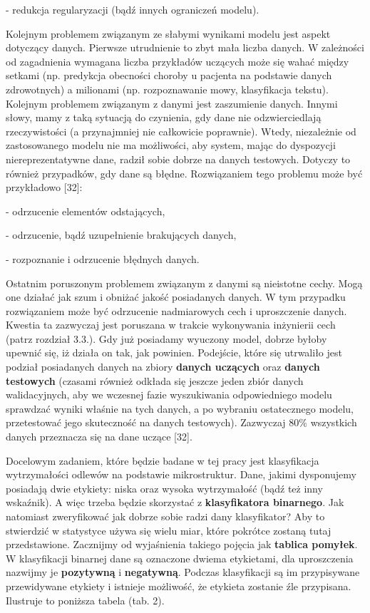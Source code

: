 - redukcja regularyzacji (bądź innych ograniczeń modelu).
  
Kolejnym problemem związanym ze słabymi wynikami modelu jest aspekt dotyczący danych. Pierwsze utrudnienie to zbyt mała liczba danych. W zależności od zagadnienia wymagana liczba przykładów uczących może się wahać między setkami (np. predykcja obecności choroby u pacjenta na podstawie danych zdrowotnych) a milionami (np. rozpoznawanie mowy, klasyfikacja tekstu). Kolejnym problemem związanym z danymi jest zaszumienie danych. Innymi słowy, mamy z taką sytuacją do czynienia, gdy dane nie odzwierciedlają rzeczywistości (a przynajmniej nie całkowicie poprawnie). Wtedy, niezależnie od zastosowanego modelu nie ma możliwości, aby system, mając do dyspozycji niereprezentatywne dane, radził sobie dobrze na danych testowych. Dotyczy to również przypadków, gdy dane są błędne. Rozwiązaniem tego problemu może być przykładowo [32]:

- odrzucenie elementów odstających,

- odrzucenie, bądź uzupełnienie brakujących danych,

- rozpoznanie i odrzucenie błędnych danych.

Ostatnim poruszonym problemem związanym z danymi są nieistotne cechy. Mogą one działać jak szum i obniżać jakość posiadanych danych. W tym przypadku rozwiązaniem może być odrzucenie nadmiarowych cech i uproszczenie danych. Kwestia ta zazwyczaj jest poruszana w trakcie wykonywania inżynierii cech (patrz rozdział 3.3.).
Gdy już posiadamy wyuczony model, dobrze byłoby upewnić się, iż działa on tak, jak powinien. Podejście, które się utrwaliło jest podział posiadanych danych na zbiory \textbf{danych uczących} oraz \textbf{danych testowych} (czasami również odkłada się jeszcze jeden zbiór danych walidacyjnych, aby we wczesnej fazie wyszukiwania odpowiedniego modelu sprawdzać wyniki właśnie na tych danych, a po wybraniu ostatecznego modelu, przetestować jego skuteczność na danych testowych). Zazwyczaj 80\% wszystkich danych przeznacza się na dane uczące [32].

Docelowym zadaniem, które będzie badane w tej pracy jest klasyfikacja wytrzymałości odlewów na podstawie mikrostruktur. Dane, jakimi dysponujemy posiadają dwie etykiety: niska oraz wysoka wytrzymałość (bądź też inny wskaźnik). A więc trzeba będzie skorzystać z \textbf{klasyfikatora binarnego}. Jak natomiast zweryfikować jak dobrze sobie radzi dany klasyfikator? Aby to stwierdzić w statystyce używa się wielu miar, które pokrótce zostaną tutaj przedstawione. Zacznijmy od wyjaśnienia takiego pojęcia jak \textbf{tablica pomyłek}. W klasyfikacji binarnej dane są oznaczone dwiema etykietami, dla uproszczenia nazwijmy je \textbf{pozytywną} i \textbf{negatywną}. Podczas klasyfikacji są im przypisywane przewidywane etykiety i istnieje możliwość, że etykieta zostanie źle przypisana. Ilustruje to poniższa tabela (tab. 2).

